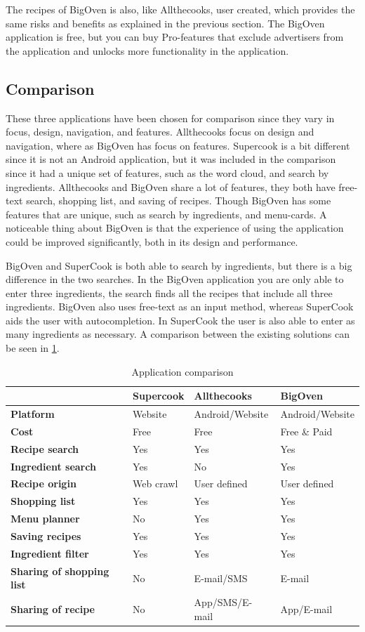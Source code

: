 The recipes of BigOven is also, like Allthecooks, user created, which provides the same risks and benefits as explained in the previous section.
The BigOven application is free, but you can buy Pro-features that exclude advertisers from the application and unlocks more functionality in the application.

\subsection{Comparison}
These three applications have been chosen for comparison since they vary in focus, design, navigation, and features. Allthecooks focus on design and navigation, where as BigOven has focus on features. Supercook is a bit different since it is not an Android application, but it was included in the comparison since it had a unique set of features, such as the word cloud, and search by ingredients.
Allthecooks and BigOven share a lot of features, they both have free-text search, shopping list, and saving of recipes. Though BigOven has some features that are unique, such as search by ingredients, and menu-cards. A noticeable thing about BigOven is that the experience of using the application could be improved significantly, both in its design and performance.

BigOven and SuperCook is both able to search by ingredients, but there is a big difference in the two searches. In the BigOven application you are only able to enter three ingredients, the search finds all the recipes that include all three ingredients. BigOven also uses free-text as an input method, whereas SuperCook aids the user with autocompletion. In SuperCook the user is also able to enter as many ingredients as necessary.
A comparison between the existing solutions can be seen in \ref{tab:appcomparison}.
\begin{table}[H]
\centering
\begin{tabular}{|>{\bfseries}l|l|l|l|}
\hline
 & \textbf{Supercook} & \textbf{Allthecooks} & \textbf{BigOven} \\
\hline
Platform & Website & Android/Website & Android/Website \\
\hline
Cost & Free & Free & Free \& Paid \\
\hline
Recipe search & Yes & Yes & Yes  \\
\hline
Ingredient search & Yes & No & Yes \\
\hline
Recipe origin & Web crawl & User defined & User defined \\
\hline
Shopping list & Yes & Yes & Yes \\
\hline
Menu planner & No & Yes & Yes \\
\hline
Saving recipes & Yes & Yes & Yes \\
\hline
Ingredient filter & Yes & Yes & Yes \\
\hline
Sharing of shopping list & No & E-mail/SMS & E-mail \\
\hline
Sharing of recipe & No & App/SMS/E-mail & App/E-mail \\
\hline
\end{tabular}
\caption{Application comparison}
\label{tab:appcomparison}
\end{table}

